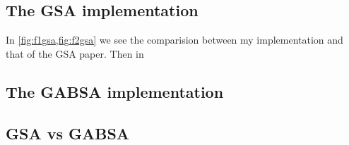  
 
%
\subsection{The GSA implementation}
In \cref{fig:f1gsa,fig:f2gsa} we see the comparision between my implementation and that of the GSA paper. Then in 
%
\subsection{The GABSA implementation}
%
\subsection{GSA vs GABSA}
%



